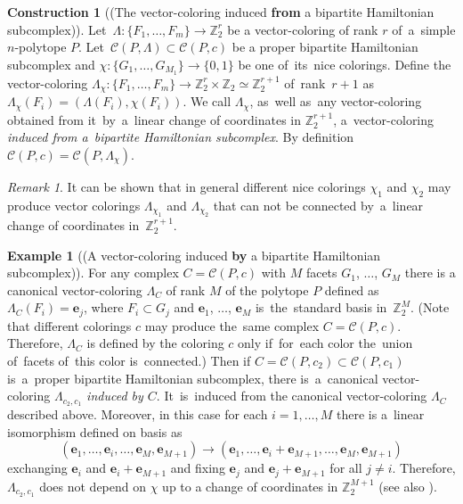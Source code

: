\documentclass[12pt]{amsart}
\theoremstyle{definition}
\newtheorem{construction}[formula]{Construction}
\newtheorem{example}[formula]{Example}
\theoremstyle{remark}
\newtheorem{remark}[formula]{Remark}
\begin{document}
\begin{construction}[(The vector-coloring induced {\bf from} a bipartite \linebreak Hamiltonian subcomplex)]\label{con:indfrom}
Let~$\Lambda\colon \{F_1,\dots, F_m\}\to \mathbb Z_2^r$ be a vector-coloring of rank $r$ of~a~simple $n$-polytope $P$.
Let~$\mathcal{C}(P,\Lambda)\subset\mathcal{C}(P,c)$ be a proper bipartite Hamiltonian subcomplex
and $\chi\colon \{G_1,\dots, G_{M_1}\}\to\{0,1\}$ be one of~its~nice colorings. Define the vector-coloring
$\Lambda_\chi\colon \{F_1,\dots, F_m\}\to \mathbb Z_2^r\times \mathbb Z_2\simeq \mathbb Z_2^{r+1}$ 
of~rank~$r+1$ as~$\Lambda_\chi(F_i)=(\Lambda(F_i),\chi(F_i))$. We call $\Lambda_\chi$, as~well as~any vector-coloring 
obtained from it~by~a~linear change of coordinates in $\mathbb Z_2^{r+1}$, a~vector-coloring {\it induced from 
a~bipartite Hamiltonian subcomplex}. By definition $\mathcal{C}(P,c)=\mathcal{C}(P,\Lambda_\chi)$.
\end{construction}
\begin{remark}
It can be shown that in general different nice colorings $\chi_1$ and $\chi_2$ may produce vector colorings $\Lambda_{\chi_1}$
and $\Lambda_{\chi_2}$ that can not be connected by~a~linear change of coordinates in~$\mathbb Z_2^{r+1}$. %

\end{remark}
\begin{example}[(A vector-coloring induced {\bf by} a bipartite Hamiltonian subcomplex)]\label{ex:vci}
For any complex $C=\mathcal{C}(P,c)$ with $M$ facets $G_1$, $\dots$, $G_M$ 
there is a canonical vector-coloring $\Lambda_C$ of rank $M$ of the polytope $P$ 
defined as $\Lambda_C(F_i)=\boldsymbol{e}_j$, where 
$F_i\subset G_j$ and $\boldsymbol{e}_1$, $\dots$, $\boldsymbol{e}_M$ is~the~standard basis in~$\mathbb Z_2^M$.
(Note that different colorings $c$ may produce the~same complex $C=\mathcal{C}(P,c)$. Therefore, $\Lambda_C$ is 
defined by the coloring $c$ only if~for~each color the~union of~facets of~this color is~connected.) Then if  
$C=\mathcal{C}(P,c_2)\subset\mathcal{C}(P,c_1)$ is~a~proper bipartite Hamiltonian subcomplex, there 
is~a~canonical vector-coloring $\Lambda_{c_2, c_1}$ {\it induced by $C$}. It~is~induced from the canonical 
vector-coloring $\Lambda_C$ described above. Moreover, in this case for each $i=1,\dots, M$
there is a~linear isomorphism defined on basis as
$$
(\boldsymbol{e}_1,\dots, \boldsymbol{e}_i,\dots, \boldsymbol{e}_M, \boldsymbol{e}_{M+1})\to
(\boldsymbol{e}_1,\dots, \boldsymbol{e}_i+\boldsymbol{e}_{M+1},\dots, \boldsymbol{e}_M, \boldsymbol{e}_{M+1}) 
$$ 
exchanging $\boldsymbol{e}_i$ and $\boldsymbol{e}_i+\boldsymbol{e}_{M+1}$ and 
fixing $\boldsymbol{e}_j$ and $\boldsymbol{e}_j+\boldsymbol{e}_{M+1}$ for all $j\ne i$. Therefore, $\Lambda_{c_2, c_1}$
does not depend on $\chi$ up to a change of coordinates in $\mathbb Z_2^{M+1}$ (see also 
\cite[Construction 8.6]{E24}).

\end{example}
\end{document}
